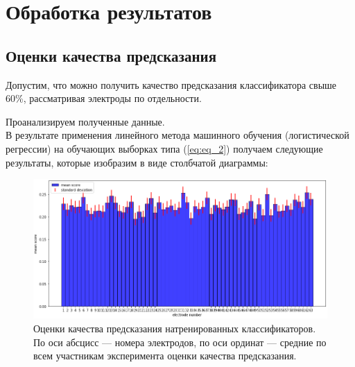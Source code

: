 \newpage
\section{Обработка результатов}

\subsection{Оценки качества предсказания}

Допустим, что можно получить качество предсказания классификатора свыше 60\%,
рассматривая электроды по отдельности.
 
Проанализируем полученные данные.\\
В результате применения линейного метода машинного обучения (логистической регрессии)
на обучающих выборках типа (\ref{eq:eq_2}) получаем следующие результаты, которые
изобразим в виде столбчатой диаграммы:

\begin{figure}[H]
    \centering
    \includegraphics[width=1.05\linewidth]{images/mean_scores.png}
    \caption{Оценки качества предсказания натренированных классификаторов.
    По оси абсцисс --- номера электродов, по оси ординат --- средние по всем участникам
    эксперимента оценки качества предсказания.}
    \label{fig_12}
\end{figure}

